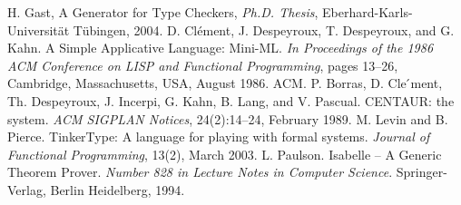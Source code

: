 \documentclass[screen]{beamer}
\begin{document}
\begin{thebibliography}{99}
	 H. Gast, A Generator for Type Checkers, \textit{Ph.D. Thesis}, Eberhard-Karls-Universit\"at T\"ubingen, 2004.
	 D. Cl\'{e}ment, J. Despeyroux, T. Despeyroux, and G. Kahn. A Simple Applicative Language: Mini-ML. \textit{In Proceedings of the 1986 ACM Conference on LISP and Functional Programming}, pages 13–26, Cambridge, Massachusetts, USA, August 1986. ACM.
	 P. Borras, D. Cle ́ment, Th. Despeyroux, J. Incerpi, G. Kahn, B. Lang, and V. Pascual. CENTAUR: the system. \textit{ACM SIGPLAN Notices}, 24(2):14–24, February 1989.
	 M. Levin and B. Pierce. TinkerType: A language for playing with formal systems. \textit{Journal of Functional Programming}, 13(2), March 2003.
	 L. Paulson. Isabelle – A Generic Theorem Prover. \textit{Number 828 in Lecture Notes in Computer Science}. Springer-Verlag, Berlin Heidelberg, 1994.
\end{thebibliography}


\end{document}
